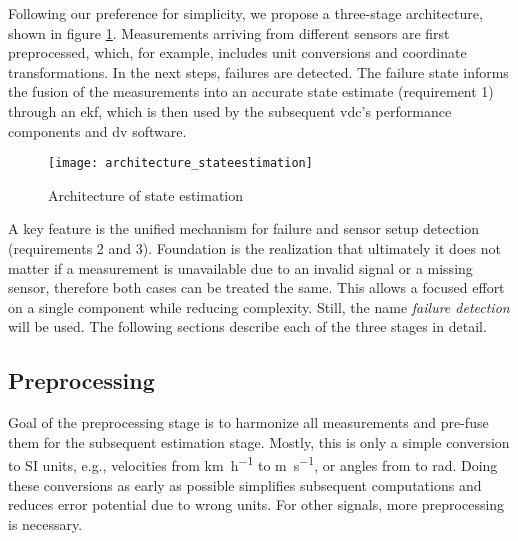 Following our preference for simplicity, we propose a three-stage architecture, shown in figure \ref{fig:architecture-stateestimation}. Measurements arriving from different sensors are first preprocessed, which, for example, includes unit conversions and coordinate transformations. In the next steps, failures are detected. The failure state informs the fusion of the measurements into an accurate state estimate (requirement 1) through an \gls{ekf}, which is then used by the subsequent \gls{vdc}'s performance components and \gls{dv} software.

\begin{figure}
	\centering
	\texttt{[image: architecture\_stateestimation]}%
	\caption{Architecture of state estimation}
	\label{fig:architecture-stateestimation}
\end{figure}

A key feature is the unified mechanism for failure and sensor setup detection (requirements 2 and 3). Foundation is the realization that ultimately it does not matter if a measurement is unavailable due to an invalid signal or a missing sensor, therefore both cases can be treated the same. This allows a focused effort on a single component while reducing complexity. Still, the name \textit{failure detection} will be used. The following sections describe each of the three stages in detail.


\subsection{Preprocessing}
Goal of the preprocessing stage is to harmonize all measurements and pre-fuse them for the subsequent estimation stage. Mostly, this is only a simple conversion to SI units, e.g., velocities from \si{\kilo\meter\per\hour} to \si{\meter\per\second}, or angles from \si{\deg} to \si{\radian}. Doing these conversions as early as possible simplifies subsequent computations and reduces error potential due to wrong units. For other signals, more preprocessing is necessary.

